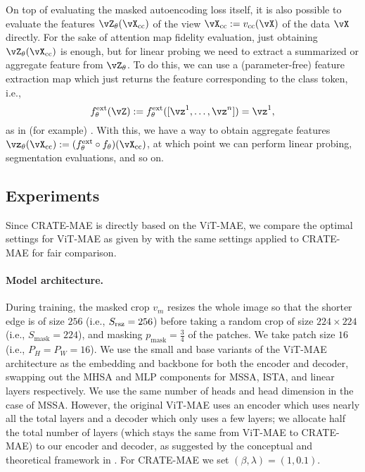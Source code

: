 \documentclass[\toplevelprefix/book-main.tex]{subfiles}
\begin{document}
On top of evaluating the masked autoencoding loss itself, it is also possible to evaluate the features \(\vZ_{\theta}(\vX_{\cc})\) of the view \(\vX_{\cc} := v_{\cc}(\vX)\) of the data \(\vX\) directly. For the sake of attention map fidelity evaluation, just obtaining \(\vZ_{\theta}(\vX_{\cc})\) is enough, but for linear probing we need to extract a summarized or aggregate feature from \(\vZ_{\theta}\). To do this, we can use a (parameter-free) feature extraction map which just returns the feature corresponding to the class token, i.e.,
\begin{equation}
    f_{\theta}^{\ext}(\vZ) := f_{\theta}^{\ext}([\vz^{1}, \dots, \vz^{n}]) = \vz^{1},
\end{equation}
as in (for example) . With this, we have a way to obtain aggregate features \(\vz_{\theta}(\vX_{\cc}) := (f_{\theta}^{\ext} \circ f_{\theta})(\vX_{\cc})\), at which point we can perform linear probing, segmentation evaluations, and so on.

\subsection{Experiments}\label{sub:image_completion_experiments}

Since CRATE-MAE is directly based on the ViT-MAE, we compare the optimal settings for ViT-MAE as given by \citep{he2022masked} with the same settings applied to CRATE-MAE for fair comparison.

\paragraph{Model architecture.} During training, the masked crop \(v_{m}\) resizes the whole image so that the shorter edge is of size \(256\) (i.e., \(S_{\mathrm{rsz}} = 256\)) before taking a random crop of size \(224 \times 224\) (i.e., \(S_{\mathrm{mask}} = 224\)), and masking \(p_{\mathrm{mask}} = \frac{3}{4}\) of the patches. We take patch size \(16\) (i.e., \(P_{H} = P_{W} = 16\)). We use the small and base variants of the ViT-MAE architecture as the embedding and backbone for both the encoder and decoder, swapping out the MHSA and MLP components for MSSA, ISTA, and linear layers respectively. We use the same number of heads and head dimension in the case of MSSA. However, the original ViT-MAE uses an encoder which uses nearly all the total layers and a decoder which only uses a few layers; we allocate half the total number of layers (which stays the same from ViT-MAE to CRATE-MAE) to our encoder and decoder, as suggested by the conceptual and theoretical framework in . For CRATE-MAE we set \((\beta, \lambda) = (1, 0.1)\).
\end{document}
